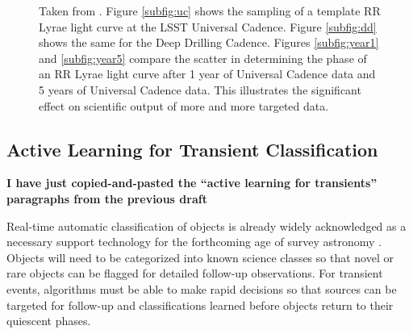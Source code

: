 \documentclass[useAMS,usenatbib,tightenlines,11pt,preprint]{aastex}
\begin{document}
\begin{figure}
{{\label{subfig:year1}
}
}
\caption{
Taken from \cite{rrlyrae}.  Figure \ref{subfig:uc} shows the sampling of
a template RR Lyrae light curve at the LSST Universal Cadence.
Figure \ref{subfig:dd} shows the same for the 
Deep Drilling Cadence.  Figures \ref{subfig:year1} and \ref{subfig:year5} compare the scatter
in determining the phase of an RR Lyrae light curve after 1 year of Universal Cadence
data and 5 years of Universal Cadence data.  This illustrates the significant effect
on scientific output of more and more targeted data.
}
\label{fig:RRLyrae}
\end{figure}




\subsection{Active Learning for Transient Classification}


{\bf I have just copied-and-pasted the ``active learning for transients''
paragraphs from the previous draft}


Real-time automatic classification of objects is already widely acknowledged as a
necessary support technology for the forthcoming age of survey astronomy
\cite{djorgovski2011,richards2011,richards2012,graham2012,mahabal2008a,mahabal2011a}.
Objects will need to be categorized into known science classes so that novel
or rare objects can be flagged for detailed follow-up observations.
For transient events, algorithms must be able to make rapid
decisions so that sources can be targeted for follow-up 
and classifications learned before
objects return to their quiescent phases.  
\end{document}
